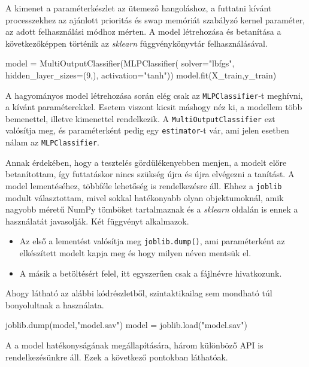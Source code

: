 A kimenet a paraméterkészlet az ütemező hangoláshoz, a futtatni kívánt processzekhez az ajánlott prioritás és swap memóriát szabályzó kernel paraméter, az adott felhasználási módhoz mérten.
A model létrehozása és betanítása a következőképpen történik az \textit{sklearn} függvénykönyvtár felhasználásával. 
\begin{python}
model = MultiOutputClassifier(MLPClassifier(
	solver="lbfgs",
	hidden_layer_sizes=(9,),
	activation="tanh"))
model.fit(X_train,y_train)
\end{python}
A hagyományos model létrehozása során elég csak az \texttt{MLPClassifier}-t meghívni, a kívánt paraméterekkel. Esetem viszont kicsit máshogy néz ki, a modellem több bemenettel, illetve kimenettel rendelkezik. A \texttt{MultiOutputClassifier} ezt valósítja meg, és paraméterként pedig egy \texttt{estimator}-t vár, ami jelen esetben nálam az \texttt{MLPClassifier}.

Annak érdekében, hogy a tesztelés gördülékenyebben menjen, a modelt előre betanítottam, így futtatáskor nincs szükség újra és újra elvégezni a tanítást.
A model lementéséhez, többféle lehetőség is rendelkezésre áll. Ehhez a \texttt{joblib} modult választottam, mivel sokkal hatékonyabb olyan objektumoknál, amik nagyobb méretű NumPy tömböket tartalmaznak és a \textit{sklearn} oldalán is ennek a használatát javasolják.
Két függvényt alkalmazok.
\begin{itemize}
	\item Az első a lementést valósítja meg \texttt{joblib.dump()}, ami paraméterként az elkészített modelt kapja meg és hogy milyen néven mentsük el.
\item A másik a betöltésért felel, itt egyszerűen csak a fájlnévre hivatkozunk.
\end{itemize}
Ahogy látható az alábbi kódrészletből, szintaktikailag sem mondható túl bonyolultnak a használata.

\begin{python}
joblib.dump(model,"model.sav") 
model = joblib.load("model.sav") 
\end{python}

A a model hatékonyságának megállapítására, három különböző API is rendelkezésünkre áll.
Ezek a következő pontokban láthatóak.

